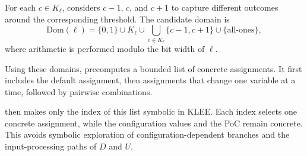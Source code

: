 For each $c\in K_\ell$, \sys considers $c-1$, $c$, and $c+1$ to capture different outcomes around the corresponding threshold. The candidate domain is
\[
\mathrm{Dom}(\ell)=
\{0,1\}\cup K_\ell
\cup \bigcup_{c\in K_\ell}\{c-1,c+1\}
\cup \{\text{all-ones}\},
\]
where arithmetic is performed modulo the bit width of $\ell$.

Using these domains, \sys precomputes a bounded list of concrete assignments. It first includes the default assignment, then assignments that change one variable at a time, followed by pairwise combinations.

\sys then makes only the index of this list symbolic in KLEE. Each index selects one concrete assignment, while the configuration values and the PoC remain concrete. This avoids symbolic exploration of configuration-dependent branches and the input-processing paths of $D$ and $U$.






